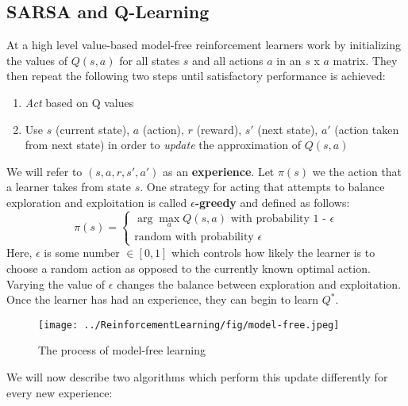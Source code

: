 \subsection{SARSA and Q-Learning}
At a high level value-based model-free reinforcement learners work by initializing the values of $Q(s, a)$ for all states $s$ and all actions $a$ in an $s$ x $a$ matrix. They then repeat the following two steps until satisfactory performance is achieved: 
\begin{enumerate}
    \item \textit{Act} based on Q values
    \item Use $s$ (current state), $a$ (action), $r$ (reward), $s'$ (next state), $a'$ (action taken from next state) in order to \textit{update} the approximation of $Q(s, a)$
\end{enumerate} 
We will refer to $(s, a, r, s', a')$ as an \textbf{experience}. Let $\pi(s)$ we the action that a learner takes from state $s$. One strategy for acting that attempts to balance exploration and exploitation is called $\epsilon$\textbf{-greedy} and defined as follows:
\begin{equation}
    \pi(s) = 
    \begin{cases} 
      \arg\!\max_aQ(s, a) \text{ with probability 1 - }\epsilon \\
      \text{random with probability }\epsilon
    \end{cases}
\end{equation}
Here, $\epsilon$ is some number $\in [0, 1]$ which controls how likely the learner is to choose a random action as opposed to the currently known optimal action. Varying the value of $\epsilon$ changes the balance between exploration and exploitation.\\
Once the learner has had an experience, they can begin to learn $Q^*$. 
\begin{figure}[ht!]
    \centering
    \texttt{[image: ../ReinforcementLearning/fig/model-free.jpeg]}
    \caption{The process of model-free learning}
\end{figure}
We will now describe two algorithms which perform this update differently for every new experience:
